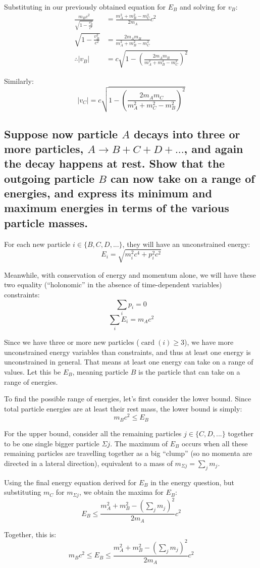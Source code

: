 \documentclass[a4paper]{scrartcl}
\begin{document}
Substituting in our previously obtained equation for \(E_B\) and solving for \(v_B\):
\begin{align*}
    \frac{m_B c^2}{\sqrt{1 - \frac{v_B^2}{c^2}}} &= \frac{m_A^2 + m_B^2 - m_C^2}{2 m_A} c^2 \\
    \sqrt{1 - \frac{v_B^2}{c^2}} &= \frac{2 m_A m_B}{m_A^2 + m_B^2 - m_C^2} \\
    \therefore |v_B| &= c \sqrt{1 - \left(\frac{2 m_A m_B}{m_A^2 + m_B^2 - m_C^2}\right)^2}
\end{align*}

Similarly:
\[|v_C| = c \sqrt{1 - \left(\frac{2 m_A m_C}{m_A^2 + m_C^2 - m_B^2}\right)^2}\]

\subsection{Suppose now particle \(A\) decays into three or more particles, \(A \rightarrow B + C + D + ...\), and again the decay happens at rest. Show that the outgoing particle \(B\) can now take on a range of energies, and express its minimum and maximum energies in terms of the various particle masses.}
For each new particle \(i \in \{B, C, D, ...\}\), they will have an unconstrained energy:
\[E_i = \sqrt{m_i^2 c^4 + p_i^2 c^2}\]

Meanwhile, with conservation of energy and momentum alone, we will have these two equality (``holonomic'' in the absence of time-dependent variables) constraints:
\[\sum_i p_i = 0\]
\[\sum_i E_i = m_A c^2\]

Since we have three or more new particles (\(\operatorname{card}(i) \ge 3\)), we have more unconstrained energy variables than constraints, and thus at least one energy is unconstrained in general. That means at least one energy can take on a range of values. Let this be \(E_B\), meaning particle \(B\) is the particle that can take on a range of energies.

To find the possible range of energies, let's first consider the lower bound. Since total particle energies are at least their rest mass, the lower bound is simply:
\[m_B c^2 \leq E_B\]

For the upper bound, consider all the remaining particles \(j \in \{C, D, ...\}\) together to be one single bigger particle \(\Sigma j\). The maximum of \(E_B\) occurs when all these remaining particles are travelling together as a big ``clump'' (so no momenta are directed in a lateral direction), equivalent to a mass of \(m_{\Sigma j} = \sum_j m_j\).

Using the final energy equation derived for \(E_B\) in the energy question, but substituting \(m_C\) for \(m_{\Sigma j}\), we obtain the maxima for \(E_B\):
\[E_B \leq \frac{m_A^2 + m_B^2 - \left(\sum_j m_j\right)^2}{2 m_A} c^2\]

Together, this is:
\[m_B c^2 \leq E_B \leq \frac{m_A^2 + m_B^2 - \left(\sum_j m_j\right)^2}{2 m_A} c^2\]
\end{document}
